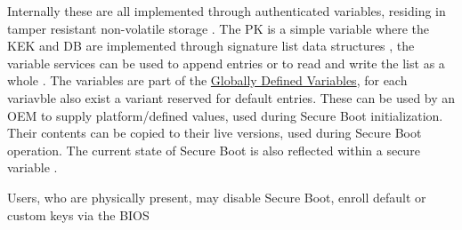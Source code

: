 Internally these are all implemented through authenticated variables, residing in tamper resistant non-volatile storage \cite[32.3]{uefi-spec}.
The \ac{PK} is a simple variable where the \ac{KEK} and \ac{DB} are implemented through signature list data structures \cite[32.4.1]{uefi-spec}, the variable services can be used to append entries or to read and write the list as a whole \cite[32.3.5 and 32.5.3]{uefi-spec}.
The variables are part of the \hyperref[sec:uefi-pi:uefi:variables]{Globally Defined Variables}, for each variavble also exist a variant reserved for default entries. These can be used by an \ac{OEM} to supply platform\-/defined values, used during Secure Boot initialization.
Their contents can be copied to their live versions, used during Secure Boot operation.
The current state of Secure Boot is also reflected within a secure variable \cite[3.3]{uefi-spec}.

Users, who are physically present, may disable Secure Boot, enroll default or custom keys via the \ac{BIOS}

\cite[32.5.3.2]{uefi-spec}


